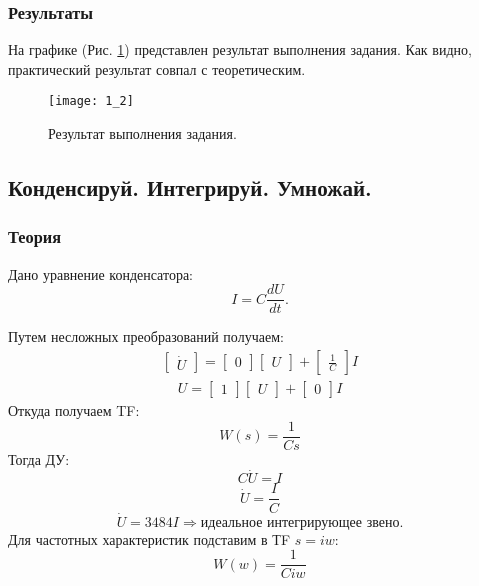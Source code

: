 \documentclass[16pt]{article}
\begin{document}
\subsubsection{Результаты}
На графике (Рис. \ref*{fig:fig1}) представлен результат выполнения задания. Как видно, практический результат совпал с теоретическим.
\begin{figure}[h!]
    \centering
    \texttt{[image: 1\_2]}
    \caption{Результат выполнения задания.}
    \label{fig:fig1}
\end{figure}

\subsection{Конденсируй. Интегрируй. Умножай.}

\subsubsection{Теория}
Дано уравнение конденсатора:
\[I = C\frac{dU}{dt}.\]

Путем несложных преобразований получаем:
\begin{align}
    \begin{bmatrix}
        \dot{U}
    \end{bmatrix}
    = 
    \begin{bmatrix}
        0 
    \end{bmatrix}
    \begin{bmatrix}
        U
    \end{bmatrix}
    + 
    \begin{bmatrix}
        \frac{1}{C}
    \end{bmatrix}
    I
\end{align}
\begin{align}
    U
    = 
    \begin{bmatrix}
        1
    \end{bmatrix}
    \begin{bmatrix}
        U
    \end{bmatrix}
    + 
    \begin{bmatrix}
        0
    \end{bmatrix}
    I
\end{align}
Откуда получаем TF:
\[
    W(s) = \frac{1}{C s}
\]
Тогда ДУ:
\[
    C \dot{U} = I
\]
\[
    \dot{U} = \frac{I}{C}
\]
\[
    \dot{U} = 3484I \Rightarrow \text{идеальное интегрирующее звено}.
\]
Для частотных характеристик подставим в ТF \(s = iw\):
\[
    W(w) = \frac{1}{C iw}
\]
\end{document}
